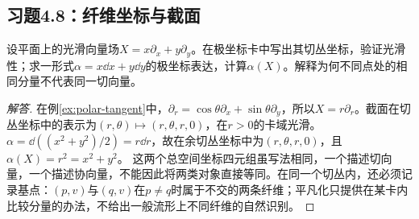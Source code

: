 \subsection*{习题4.8：纤维坐标与截面}
设平面上的光滑向量场$X=x\partial_x+y\partial_y$。在极坐标卡中写出其切丛坐标，验证光滑性；求一形式$\alpha=x\dd x+y\dd y$的极坐标表达，计算$\alpha(X)$。解释为何不同点处的相同分量不代表同一切向量。
\begin{proof}[解答]
在例\ref{ex:polar-tangent}中，$\partial_r=\cos\theta\partial_x+\sin\theta\partial_y$，所以$X=r\partial_r$。截面在切丛坐标中的表示为$(r,\theta)\mapsto(r,\theta,r,0)$，在$r>0$的卡域光滑。$\alpha=\dd((x^2+y^2)/2)=r\dd r$，故在余切丛坐标中为$(r,\theta,r,0)$，且$\alpha(X)=r^2=x^2+y^2$。
这两个总空间坐标四元组虽写法相同，一个描述切向量，一个描述协向量，不能因此将两类对象直接等同。在同一个切丛内，还必须记录基点：$(p,v)$与$(q,v)$在$p\ne q$时属于不交的两条纤维；平凡化只提供在某卡内比较分量的办法，不给出一般流形上不同纤维的自然识别。
\end{proof}
